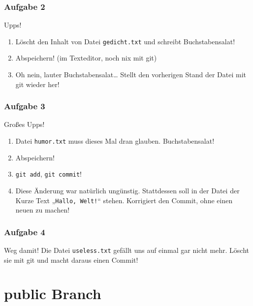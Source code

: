 \documentclass{beamer}
\begin{document}
\begin{frame}
	\frametitle{Aufgabe 2}
	\begin{block}{Upps!}
		\begin{enumerate}
			\item Löscht den Inhalt von Datei \texttt{gedicht.txt} und schreibt Buchstabensalat!
			\pause
			\item Abspeichern! (im Texteditor, noch nix mit git)
			\pause
			\item Oh nein, lauter Buchstabensalat… Stellt den vorherigen Stand der Datei mit git wieder her!
		\end{enumerate}
	\end{block}
\end{frame}

\begin{frame}
	\frametitle{Aufgabe 3}
	\begin{block}{Großes Upps!}
		\begin{enumerate}
			\item Datei \texttt{humor.txt} muss dieses Mal dran glauben. Buchstabensalat!
			\pause
			\item Abspeichern!
			\pause
			\item \texttt{git add}, \texttt{git commit}!
			\pause
			\item Diese Änderung war natürlich ungünstig.
				Stattdessen soll in der Datei der Kurze Text „\texttt{Hallo, Welt!}“ stehen.
				Korrigiert den Commit, ohne einen neuen zu machen!
		\end{enumerate}
	\end{block}
\end{frame}

\begin{frame}
	\frametitle{Aufgabe 4}
	\begin{block}{Weg damit!}
		Die Datei \texttt{useless.txt} gefällt uns auf einmal gar nicht mehr.
		Löscht sie mit git und macht daraus einen Commit!
	\end{block}
\end{frame}

\section{public Branch}
\end{document}
